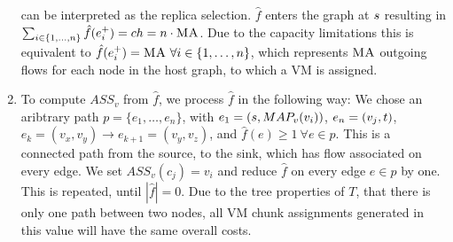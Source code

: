 \documentclass[9pt,twocolumn]{scrartcl}
\newcommand{\Chunk}{\ensuremath{c}}
\newcommand{\MaFactor}{\ensuremath{\textsc{MA}}}
\newcommand{\Path}{\ensuremath{p}}
\newcommand{\VmChunkAssignment}{\ensuremath{ASS_v}}
\newcommand{\NodeMapping}{\ensuremath{MAP_v}}
\newcommand{\VirtualNode}{\ensuremath{v}}
\newcommand{\SubstrateNode}{\ensuremath{v}}
\newcommand{\SubstrateEdge}{\ensuremath{e}}
\newcommand{\Tree}{\ensuremath{T}}
\newcommand{\Vms}{\ensuremath{n}}
\newcommand{\ChunkTypes}{\ensuremath{ch}}
\begin{document}
\begin{enumerate}
can be interpreted as the replica selection. $\hat f$ enters the graph at
$s$ resulting in $\sum_{i \in \{1,\dots,\Vms\}}\hat f(\SubstrateEdge_i^+)
= \ChunkTypes = \Vms \cdot \MaFactor$. Due to the capacity limitations this is
equivalent to $\hat f(\SubstrateEdge_i^+) = \MaFactor ~ \forall i \in
\{1,\dots, \Vms\}$, which represents $\MaFactor$ outgoing flows for each node
in the host graph, to which a VM is assigned.
\item To compute $\VmChunkAssignment$ from $\hat f$, we process $\hat f$ in the
following way: We chose an aribtrary path $\Path =
\{\SubstrateEdge_{1}, \dots, \SubstrateEdge_{n}\}$, with $\SubstrateEdge_{1} =
(\Source, \NodeMapping(\VirtualNode_i))$, $\SubstrateEdge_{n} =
(\SubstrateNode_j, \Sink)$, $\SubstrateEdge_k= (\SubstrateNode_x,
\SubstrateNode_y) \rightarrow \SubstrateEdge_{k+1} = (\SubstrateNode_y,
\SubstrateNode_z)$, and $\hat f(\SubstrateEdge)\geq 1 ~ \forall \SubstrateEdge
\in \Path$. This is a connected path from the source, to the sink, which has
flow associated on every edge. We set $\VmChunkAssignment(\Chunk_j) =
\VirtualNode_i$ and reduce $\hat f$ on every edge $\SubstrateEdge \in \Path$ by
one. This is repeated, until $|\hat f| = 0$. Due to the tree properties of
$\Tree$, that there is only one path between two nodes, all VM chunk
assignments generated in this value will have the same overall costs.


\end{enumerate}
\end{document}
